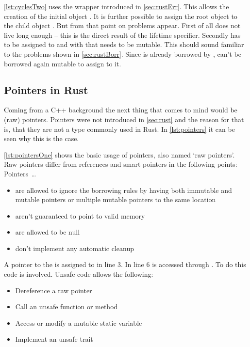 \documentclass[thesis]{subfiles}
\begin{document}
    \autoref{lst:cyclesTwo} uses the  wrapper introduced in \autoref{sec:rustErr}.
    This allows the creation of the initial \Node object .
    It is further possible to assign the root object  to the child object .
    But from that point on problems appear.
    First of all does  not live long enough -- this is the direct result of the lifetime specifier.
    Secondly has  to be assigned to  and with that  needs to be mutable.
    This should sound familiar to the problems shown in \autoref{sec:rustBorr}.
    Since  is already borrowed by ,  can't be borrowed again mutable to assign  to it.

  \subsection{Pointers in Rust}
    Coming from a C++ background the next thing that comes to mind would be (raw) pointers.
    Pointers were not introduced in \autoref{sec:rust} and the reason for that is, that they are not a type commonly used in Rust\autocite[Raw Pointers]{rust-book1}.
    In \autoref{lst:pointers} it can be seen why this is the case.

    \autoref{lst:pointersOne} shows the basic usage of pointers, also named `raw pointers'.
    Raw pointers differ from references and smart pointers in the following points\autocite[Unsafe Rust]{rust-book}: Pointers~\ldots
    \begin{itemize}
      \item are allowed to ignore the borrowing rules by having both immutable and mutable pointers or multiple mutable pointers to the same location
      \item aren't guaranteed to point to valid memory
      \item are allowed to be null
      \item don’t implement any automatic cleanup
    \end{itemize}
    A pointer to the \String {} is assigned to  in line 3.
    In line 6  is accessed through .
    To do this  code is involved.
    Unsafe code allows the following\autocite[Unsafe Rust]{rust-book}:
    \begin{itemize}
      \item Dereference a raw pointer
      \item Call an unsafe function or method
      \item Access or modify a mutable static variable
      \item Implement an unsafe trait
    \end{itemize}
\end{document}
